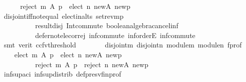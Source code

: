 \begin{isabellebody}
\ {}{\isacharcolon}{\kern0pt}\isanewline
\ \ \ \ {\isachardoublequoteopen}{\isacharparenleft}{\kern0pt}reject\ m\ A\ p\ {\isasyminter}\ elect\ n\ {\isacharquery}{\kern0pt}new{\isacharunderscore}{\kern0pt}A\ {\isacharquery}{\kern0pt}new{\isacharunderscore}{\kern0pt}p{\isacharparenright}{\kern0pt}\ {\isacharequal}{\kern0pt}\ {\isacharbraceleft}{\kern0pt}{\isacharbraceright}{\kern0pt}{\isachardoublequoteclose}\isanewline
\ \ \ \ \isamarkupfalse%
\ disjoint{\isacharunderscore}{\kern0pt}iff{\isacharunderscore}{\kern0pt}not{\isacharunderscore}{\kern0pt}equal\ elect{\isacharunderscore}{\kern0pt}in{\isacharunderscore}{\kern0pt}alts\ set{\isacharunderscore}{\kern0pt}rev{\isacharunderscore}{\kern0pt}mp\isanewline
\ \ \ \ \ \ \ \ \ \ result{\isacharunderscore}{\kern0pt}disj\ Int{\isacharunderscore}{\kern0pt}commute\ boolean{\isacharunderscore}{\kern0pt}algebra{\isacharunderscore}{\kern0pt}cancel{\isachardot}{\kern0pt}inf{}\isanewline
\ \ \ \ \ \ \ \ \ \ defer{\isacharunderscore}{\kern0pt}not{\isacharunderscore}{\kern0pt}elec{\isacharunderscore}{\kern0pt}or{\isacharunderscore}{\kern0pt}rej\ inf{\isachardot}{\kern0pt}commute\ inf{\isachardot}{\kern0pt}orderE\ inf{\isacharunderscore}{\kern0pt}commute\isanewline
\ \ \ \ \isamarkupfalse%
\ {\isacharparenleft}{\kern0pt}smt\ {\isacharparenleft}{\kern0pt}verit{\isacharcomma}{\kern0pt}\ ccfv{\isacharunderscore}{\kern0pt}threshold{\isacharparenright}{\kern0pt}{\isacharparenright}{\kern0pt}\isanewline
\ \ \isamarkupfalse%
\ {}\ {}\ {}\ {}\ disjoint{\isacharunderscore}{\kern0pt}m\ disjoint{\isacharunderscore}{\kern0pt}n\ module{\isacharunderscore}{\kern0pt}m\ module{\isacharunderscore}{\kern0pt}n\ f{\isacharunderscore}{\kern0pt}prof\ \isamarkupfalse%
\isanewline
\ \ \ \ {\isachardoublequoteopen}{\isacharparenleft}{\kern0pt}elect\ m\ A\ p\ {\isasymunion}\ elect\ n\ {\isacharquery}{\kern0pt}new{\isacharunderscore}{\kern0pt}A\ {\isacharquery}{\kern0pt}new{\isacharunderscore}{\kern0pt}p{\isacharparenright}{\kern0pt}\ {\isasyminter}\isanewline
\ \ \ \ \ \ \ \ \ \ {\isacharparenleft}{\kern0pt}reject\ m\ A\ p\ {\isasymunion}\ reject\ n\ {\isacharquery}{\kern0pt}new{\isacharunderscore}{\kern0pt}A\ {\isacharquery}{\kern0pt}new{\isacharunderscore}{\kern0pt}p{\isacharparenright}{\kern0pt}\ {\isacharequal}{\kern0pt}\ {\isacharbraceleft}{\kern0pt}{\isacharbraceright}{\kern0pt}{\isachardoublequoteclose}\isanewline
\ \ \ \ \isamarkupfalse%
\ inf{\isacharunderscore}{\kern0pt}sup{\isacharunderscore}{\kern0pt}aci{\isacharparenleft}{\kern0pt}{}{\isacharparenright}{\kern0pt}\ inf{\isacharunderscore}{\kern0pt}sup{\isacharunderscore}{\kern0pt}distrib{}\ def{\isacharunderscore}{\kern0pt}presv{\isacharunderscore}{\kern0pt}fin{\isacharunderscore}{\kern0pt}prof\isanewline

\end{isabellebody}
